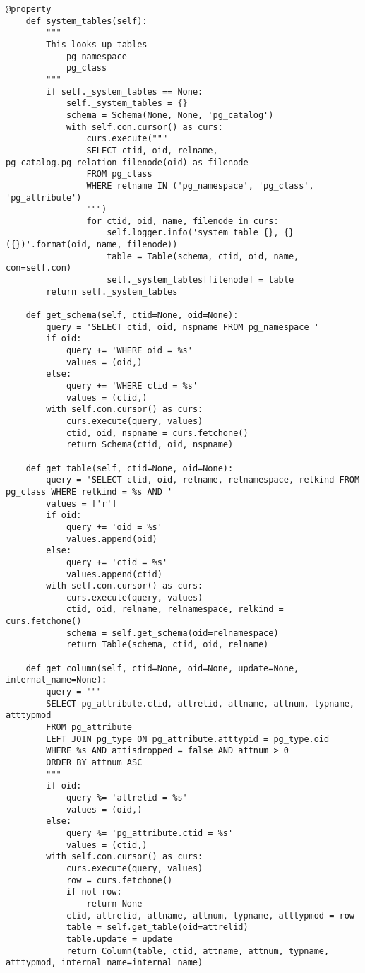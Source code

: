 \begin{lstlisting}[caption={utils/inspector.py}]
    @property
    def system_tables(self):
        """
        This looks up tables
            pg_namespace
            pg_class
        """
        if self._system_tables == None:
            self._system_tables = {}
            schema = Schema(None, None, 'pg_catalog')
            with self.con.cursor() as curs:
                curs.execute("""
                SELECT ctid, oid, relname, pg_catalog.pg_relation_filenode(oid) as filenode
                FROM pg_class
                WHERE relname IN ('pg_namespace', 'pg_class', 'pg_attribute')
                """)
                for ctid, oid, name, filenode in curs:
                    self.logger.info('system table {}, {} ({})'.format(oid, name, filenode))
                    table = Table(schema, ctid, oid, name, con=self.con)
                    self._system_tables[filenode] = table
        return self._system_tables

    def get_schema(self, ctid=None, oid=None):
        query = 'SELECT ctid, oid, nspname FROM pg_namespace '
        if oid:
            query += 'WHERE oid = %s'
            values = (oid,)
        else:
            query += 'WHERE ctid = %s'
            values = (ctid,)
        with self.con.cursor() as curs:
            curs.execute(query, values)
            ctid, oid, nspname = curs.fetchone()
            return Schema(ctid, oid, nspname)

    def get_table(self, ctid=None, oid=None):
        query = 'SELECT ctid, oid, relname, relnamespace, relkind FROM pg_class WHERE relkind = %s AND '
        values = ['r']
        if oid:
            query += 'oid = %s'
            values.append(oid)
        else:
            query += 'ctid = %s'
            values.append(ctid)
        with self.con.cursor() as curs:
            curs.execute(query, values)
            ctid, oid, relname, relnamespace, relkind = curs.fetchone()
            schema = self.get_schema(oid=relnamespace)
            return Table(schema, ctid, oid, relname)

    def get_column(self, ctid=None, oid=None, update=None, internal_name=None):
        query = """
        SELECT pg_attribute.ctid, attrelid, attname, attnum, typname, atttypmod
        FROM pg_attribute
        LEFT JOIN pg_type ON pg_attribute.atttypid = pg_type.oid
        WHERE %s AND attisdropped = false AND attnum > 0
        ORDER BY attnum ASC
        """
        if oid:
            query %= 'attrelid = %s'
            values = (oid,)
        else:
            query %= 'pg_attribute.ctid = %s'
            values = (ctid,)
        with self.con.cursor() as curs:
            curs.execute(query, values)
            row = curs.fetchone()
            if not row:
                return None
            ctid, attrelid, attname, attnum, typname, atttypmod = row
            table = self.get_table(oid=attrelid)
            table.update = update
            return Column(table, ctid, attname, attnum, typname, atttypmod, internal_name=internal_name)


\end{lstlisting}
